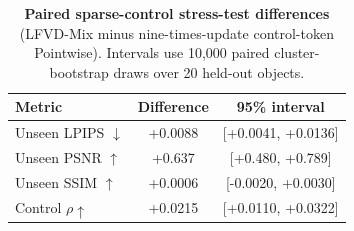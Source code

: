 \begin{table}[t]
\centering
\caption{\textbf{Paired sparse-control stress-test differences} (LFVD-Mix
minus nine-times-update control-token Pointwise). Intervals use 10,000 paired
cluster-bootstrap draws over 20 held-out objects.}
\label{tab:sparse_ci}
\scriptsize\setlength{\tabcolsep}{3pt}
\begin{tabular*}{\linewidth}{@{\extracolsep{\fill}}lcc@{}}
\toprule
Metric & Difference & 95\% interval \\
\midrule
Unseen LPIPS $\downarrow$ & +0.0088 & [+0.0041, +0.0136] \\
Unseen PSNR $\uparrow$ & +0.637 & [+0.480, +0.789] \\
Unseen SSIM $\uparrow$ & +0.0006 & [-0.0020, +0.0030] \\
Control $\rho\uparrow$ & +0.0215 & [+0.0110, +0.0322] \\
\bottomrule
\end{tabular*}
\end{table}
